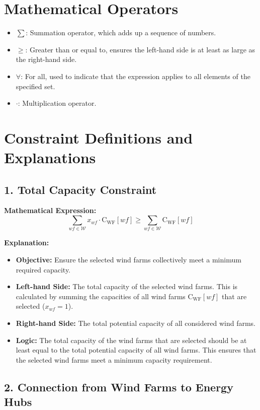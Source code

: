 \section*{Mathematical Operators}

\begin{itemize}
    \item \( \sum \): Summation operator, which adds up a sequence of numbers.
    \item \( \geq \): Greater than or equal to, ensures the left-hand side is at least as large as the right-hand side.
    \item \( \forall \): For all, used to indicate that the expression applies to all elements of the specified set.
    \item \( \cdot \): Multiplication operator.
\end{itemize}

\section*{Constraint Definitions and Explanations}

\subsection*{1. Total Capacity Constraint}

\textbf{Mathematical Expression:}
\[
\sum_{wf \in \mathcal{W}} x_{wf} \cdot \text{C}_{\text{WF}}[wf] \geq \sum_{wf \in \mathcal{W}} \text{C}_{\text{WF}}[wf]
\]

\textbf{Explanation:}
\begin{itemize}
    \item \textbf{Objective:} Ensure the selected wind farms collectively meet a minimum required capacity.
    \item \textbf{Left-hand Side:} The total capacity of the selected wind farms. This is calculated by summing the capacities of all wind farms \( \text{C}_{\text{WF}}[wf] \) that are selected (\( x_{wf} = 1 \)).
    \item \textbf{Right-hand Side:} The total potential capacity of all considered wind farms.
    \item \textbf{Logic:} The total capacity of the wind farms that are selected should be at least equal to the total potential capacity of all wind farms. This ensures that the selected wind farms meet a minimum capacity requirement.
\end{itemize}

\subsection*{2. Connection from Wind Farms to Energy Hubs}

